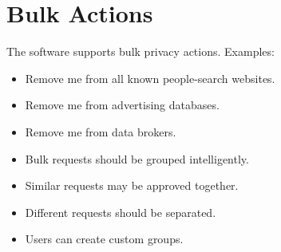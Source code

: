 
\chapter{Bulk Actions}

The software supports bulk privacy actions.
Examples:
\begin{itemize}
	\item Remove me from all known people-search websites.
	\item Remove me from advertising databases.
	\item Remove me from data brokers.
	\item Bulk requests should be grouped intelligently.
	\item Similar requests may be approved together.
	\item Different requests should be separated.
	\item Users can create custom groups.
\end{itemize}


\sentinelchapterend
